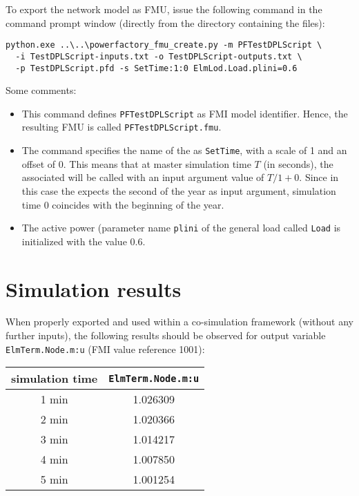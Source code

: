 To export the network model as FMU, issue the following command in the command prompt window (directly from the directory  containing the files):
\begin{verbatim}
python.exe ..\..\powerfactory_fmu_create.py -m PFTestDPLScript \
  -i TestDPLScript-inputs.txt -o TestDPLScript-outputs.txt \
  -p TestDPLScript.pfd -s SetTime:1:0 ElmLod.Load.plini=0.6
\end{verbatim}
Some comments:
\begin{itemize}
  \item This command defines \texttt{PFTestDPLScript} as FMI model identifier.
  Hence, the resulting FMU is called \texttt{PFTestDPLScript.fmu}.
  \item The command specifies the name of the \dplscript as \texttt{SetTime}, with a scale of 1 and an offset of 0.
  This means that at master simulation time $T$ (in seconds), the associated \dplscript will be called with an input argument value of $T/1 + 0$.
  Since in this case the \dplscript expects the second of the year as input argument, simulation time 0 coincides with the beginning of the year.
  \item The active power (parameter name \texttt{plini} of the general load called \texttt{Load} is initialized with the value $0.6$.
\end{itemize}

\section{Simulation results}
\label{sec:examples:results}

When properly exported and used within a co-simulation framework (without any further inputs), the following results should be observed for output variable \texttt{ElmTerm.Node.m:u} (FMI value reference 1001):

\begin{center}
  \begin{tabular}{|c|c|}
    \hline 
    simulation time & \texttt{ElmTerm.Node.m:u} \\ 
    \hline \hline 
    1 min & 1.026309 \\ \hline 
    2 min & 1.020366 \\ \hline 
    3 min & 1.014217 \\ \hline 
    4 min & 1.007850 \\ \hline 
    5 min & 1.001254 \\ \hline 
  \end{tabular} 
\end{center}
